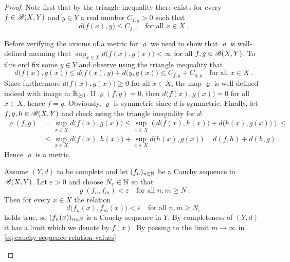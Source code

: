 \begin{proof}
  Note first that  by the triangle inequality there exists for every $f\in \mathscr{B} (X,Y)$ and $y\in Y$
  a real number $C_{f,y}>0$ such that
  \[ 
    d\big(f(x),y\big) \leq C_{f,x} \quad \text{for all } x\in X \ .
  \]  
  \begin{adromanlist}
  \item
    Before verifying the axioms of a metric for $\varrho$ we need to show that $\varrho$ is well-defined meaning that
    $\sup_{x\in X} d\big( f(x),g(x)\big) < \infty$ for all $f,g \in \mathscr{B} (X,Y)$. 
    To this end fix some $y\in Y$ and observe using the triangle inequality
    that  
    \[
      d\big( f(x),g(x)\big)  \leq d\big( f(x), y\big) + d\big( y, g(x)\big)
      \leq C_{f,y} + C_{g,y} \quad \text{for all } x \in X \ . 
    \]
    Since furthermore $d\big( f(x),g(x)\big) \geq 0$ for all $x\in X$, the map $\varrho$ is well-defined indeed
    with image in $\mathbb{R}_{\geq 0}$.
    If $\varrho (f,g) = 0$, then $d \big( f(x),g(x) \big)=0$ for all $x\in X$, hence $f=g$.
    Obviously, $\varrho$ is symmetric since $d$ is symmetric. Finally, let
    $f,g,h\in \mathscr{B} (X,Y)$ and check using the triangle inequality for $d$:
    \begin{equation*}
      \begin{split}
      \varrho (f,g) & = \sup_{x\in X} d\big( f(x),g(x)\big)  \leq
      \sup_{x\in X} \left( d\big( f(x),h (x)\big) + d\big( h(x),g(x)\big)\right)  \leq \\
      & \leq \sup_{x\in X} d\big( f(x),h (x)\big) + \sup_{x\in X} d\big( h(x),g(x)\big) =
      d(f,h) + d(h,g) \ . 
      \end{split}
    \end{equation*}
    Hence  $\varrho$ is a metric. 
   \item
     Assume $(Y,d)$ to be complete and let $(f_n)_{n\in\mathbb{N}}$ be a  Cauchy sequence in $\mathscr{B} (X,Y)$.
     Let $\varepsilon >0$ and choose $N_\varepsilon \in \mathbb{N}$ so that
     \[
           \varrho (f_n,f_m) < \varepsilon \quad \text{for all } n,m\geq N \ . 
     \]
     Then for every $x\in X$ the relation
     \begin{equation}
       \label{eq:cauchy-sequence-relation-values}
       d\big(f_n(x),f_m(x)\big) < \varepsilon \quad \text{for all } n,m\geq N_\varepsilon 
     \end{equation}
     holds true, so $(f_n(x))_{n\in \mathbb{N}}$ is a Cauchy sequence in $Y$.
     By completeness of $(Y,d)$ it has a limit which we denote by $f(x)$.
     By passing to the limit $m\to \infty$ in \eqref{eq:cauchy-sequence-relation-values}

\end{adromanlist}
\end{proof}
